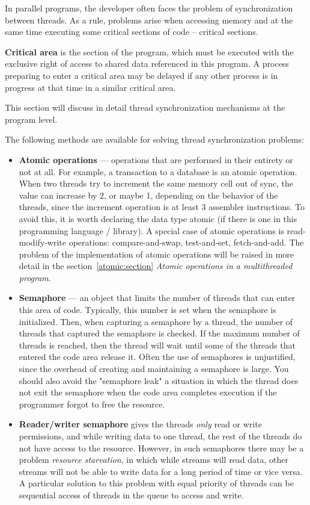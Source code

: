 { %
	\par In parallel programs, the developer often faces the problem of synchronization between threads. As a rule, problems arise when accessing memory and at the same time executing some critical sections of code – critical sections.
	\par\textbf{Critical area} is the section of the program, which must be executed with the exclusive right of access to shared data referenced in this program. A process preparing to enter a critical area may be delayed if any other process is in progress at that time in a similar critical area. 
	\par This section will discuss in detail thread synchronization mechanisms at the program level.
	\par The following methods are available for solving thread synchronization problems:
		\begin{itemize}
			\item\textbf{Atomic operations} --- operations that are performed in their entirety or not at all. For example, a transaction to a database is an atomic operation. When two threads try to increment the same memory cell out of sync, the value can increase by 2, or maybe 1, depending on the behavior of the threads, since the increment operation is at least 3 assembler instructions. To avoid this, it is worth declaring the data type atomic (if there is one in this programming language / library). A special case of atomic operations is read-modify-write operations: compare-and-swap, test-and-set, fetch-and-add. The problem of the implementation of atomic operations will be raised in more detail in the section~\ref{atomic:section} \textit{Atomic operations in a multithreaded program}.
			\item\textbf{Semaphore} --- an object that limits the number of threads that can enter this area of code. Typically, this number is set when the semaphore is initialized. Then, when capturing a semaphore by a thread, the number of threads that captured the semaphore is checked. If the maximum number of threads is reached, then the thread will wait until some of the threads that entered the code area release it. Often the use of semaphores is unjustified, since the overhead of creating and maintaining a semaphore is large. You should also avoid the "semaphore leak" a situation in which the thread does not exit the semaphore when the code area completes execution if the programmer forgot to free the resource.
			\item\textbf{Reader/writer semaphore} gives the threads \textit{only} read or write permissions, and while writing data to one thread, the rest of the threads do not have access to the resource. However, in such semaphores there may be a problem \textit{resource starvation}, in which while streams will read data, other streams will not be able to write data for a long period of time or vice versa. A particular solution to this problem with equal priority of threads can be sequential access of threads in the queue to access and write.

\end{itemize}}
